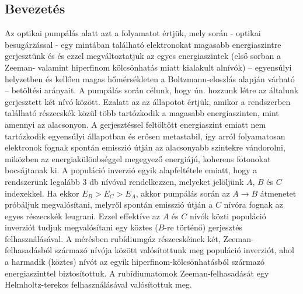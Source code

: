 \begin{multicols}{2}
\section{Bevezetés}
Az optikai pumpálás alatt azt a folyamatot értjük, mely során - optikai besugárzással - egy mintában található elektronokat magasabb energiaszintre gerjesztünk és és ezzel megváltoztatjuk az egyes energiaszintek (első sorban a Zeeman- valamint hiperfinom kölcsönhatás miatt kialakult alnívók) -- egyensúlyi helyzetben és kellően magas hőmérsékleten a Boltzmann-eloszlás alapján várható -- betöltési arányait. A pumpálás során célunk, hogy ún.  hozzunk létre az általunk gerjesztett két nívó között. Ezalatt az az állapotot értjük, amikor a rendszerben található részecskék közül több tartózkodik a magasabb energiaszinten, mint amennyi az alacsonyon. A gerjesztéssel feltöltött energiaszint emiatt nem tartózkodik egyensúlyi állapotban és erősen metastabil, így arról folyamatosan elektronok fognak spontán emisszió útján az alacsonyabb szintekre vándorolni, miközben az energiakülönbséggel megegyező energiájú, koherens fotonokat bocsájtanak ki. A populáció inverzió egyik alapfeltétele emiatt, hogy a rendszerünk legalább $3$ db nívóval rendelkezzen, melyeket jelöljünk $A$, $B$ és $C$ indexekkel. Ha ekkor $E_{B} > E_{C} > E_{A}$, akkor pumpálás során az $A \to B$ átmenetet próbáljuk megvalósítani, melyről spontán emisszió útján a $C$ nívóra fognak az egyes részecskék leugrani. Ezzel effektíve az $A$ és $C$ nívók közti populáció inverziót tudjuk megvalósítani egy köztes ($B$-re történő) gerjesztés felhasználásával. \newline
A mérésben rubídiumgáz részecskéinek két, Zeeman-felhasadásból származó nívója között valósítottunk meg populáció inverziót, ahol a harmadik (köztes) nívót az egyik hiperfinom-kölcsönhatásból származó energiaszinttel biztosítottuk. A rubídiumatomok Zeeman-felhasadását egy Helmholtz-terekcs felhasználásával valósítottuk meg.



\end{multicols}
